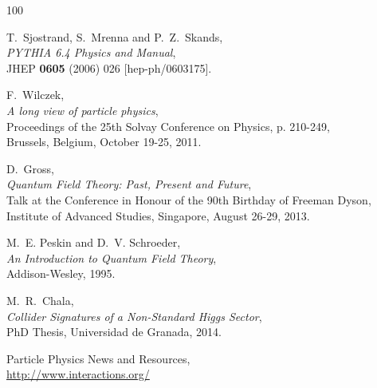 \documentclass[11pt,a4paper,twoside,pdf]{article}
\numberwithin{equation}{section}
\begin{document}
\begin{thebibliography}{100}

  T.~Sjostrand, S.~Mrenna and P.~Z.~Skands, \\
  {\em PYTHIA 6.4 Physics and Manual}, \\
  JHEP {\bf 0605} (2006) 026  [hep-ph/0603175].
  
  F.~Wilczek, \\
  {\em A long view of particle physics}, \\
  Proceedings of the 25th Solvay Conference on Physics, p. 210-249, \\  
  Brussels, Belgium, October 19-25, 2011.

  D.~Gross, \\
  {\em Quantum Field Theory: Past, Present and Future}, \\
  Talk at the Conference in Honour of the 90th Birthday of Freeman Dyson, \\
  Institute of Advanced Studies, Singapore, August 26-29, 2013.

  M.~E. Peskin and D.~V. Schroeder, \\
  {\em An Introduction to Quantum Field Theory}, \\
  Addison-Wesley, 1995.
  
  M.~R.~Chala, \\
  {\em Collider Signatures of a Non-Standard Higgs Sector}, \\
  PhD Thesis, Universidad de Granada, 2014.

 Particle Physics News and Resources, \\
 \href{http://www.interactions.org/}{http://www.interactions.org/}
 
\end{thebibliography}
\end{document}
